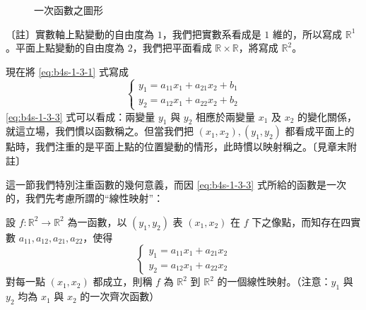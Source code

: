 \begin{figure}[H]
\centering
{}
\caption{一次函數之圖形}
\label{fig:b4s-1-3-1}
\end{figure}

〔註〕實數軸上點變動的自由度為 $1$，我們把實數系看成是 $1$ 維的，所以寫成 $\mathbb{R}^1$。平面上點變動的自由度為 $2$，我們把平面看成 $\mathbb{R} \times \mathbb{R}$，將寫成 $\mathbb{R}^2$。

現在將 \eqref{eq:b4s-1-3-1} 式寫成
\begin{equation}
\begin{cases}
y_1 = a_{11}x_1 + a_{21}x_2 + b_1 \\
y_2 = a_{12}x_1 + a_{22}x_2 + b_2
\end{cases} \label{eq:b4s-1-3-3}
\end{equation}
\eqref{eq:b4s-1-3-3} 式可以看成：兩變量 $y_1$ 與 $y_2$ 相應於兩變量 $x_1$ 及 $x_2$ 的變化關係，就這立場，我們慣以函數稱之。但當我們把 $(x_1, x_2), (y_1, y_2)$ 都看成平面上的點時，我們注重的是平面上點的位置變動的情形，此時慣以映射稱之。〔見章末附註〕

這一節我們特別注重函數的幾何意義，而因 \eqref{eq:b4s-1-3-3} 式所給的函數是一次的，我們先考慮所謂的“線性映射”：

\begin{definition}[定義]
設 $f: \mathbb{R}^2 \to \mathbb{R}^2$ 為一函數，以 $(y_1, y_2)$ 表 $(x_1, x_2)$ 在 $f$ 下之像點，而知存在四實數 $a_{11}, a_{12}, a_{21}, a_{22}$，使得
\begin{equation}
\begin{cases}
y_1 = a_{11}x_1 + a_{21}x_2 \\
y_2 = a_{12}x_1 + a_{22}x_2
\end{cases} \label{eq:b4s-1-3-4}
\end{equation}
對每一點 $(x_1, x_2)$ 都成立，則稱 $f$ 為 $\mathbb{R}^2$ 到 $\mathbb{R}^2$ 的一個線性映射。（注意：$y_1$ 與 $y_2$ 均為 $x_1$ 與 $x_2$ 的一次齊次函數）
\end{definition}

